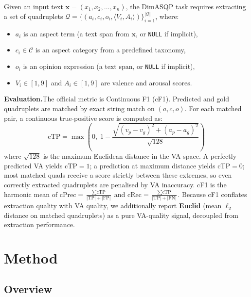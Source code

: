 \documentclass[runningheads]{llncs}
\begin{document}
Given an input text $\mathbf{x} = (x_1, x_2, \ldots, x_n)$, the DimASQP task requires extracting a set of quadruplets $\mathcal{Q} = \{(a_i, c_i, o_i, \langle V_i, A_i \rangle)\}_{i=1}^{|\mathcal{Q}|}$, where:
\begin{itemize}
    \item $a_i$ is an aspect term (a text span from $\mathbf{x}$, or \texttt{NULL} if implicit),
    \item $c_i \in \mathcal{C}$ is an aspect category from a predefined taxonomy,
    \item $o_i$ is an opinion expression (a text span, or \texttt{NULL} if implicit),
    \item $V_i \in [1, 9]$ and $A_i \in [1, 9]$ are valence and arousal scores.
\end{itemize}

\noindent\textbf{Evaluation.}\quad The official metric is Continuous F1 (cF1). Predicted and gold quadruplets are matched by exact string match on $(a, c, o)$. For each matched pair, a continuous true-positive score is computed as:
\begin{equation}
    \text{cTP} = \max\left(0,\; 1 - \frac{\sqrt{(v_p - v_g)^2 + (a_p - a_g)^2}}{\sqrt{128}}\right)
    \label{eq:ctp}
\end{equation}
where $\sqrt{128}$ is the maximum Euclidean distance in the VA space. A perfectly predicted VA yields $\text{cTP}=1$; a prediction at maximum distance yields $\text{cTP}=0$; most matched quads receive a score strictly between these extremes, so even correctly extracted quadruplets are penalised by VA inaccuracy.
cF1 is the harmonic mean of
$\text{cPrec} = \frac{\sum \text{cTP}}{|\text{TP}| + |\text{FP}|}$
and
$\text{cRec} = \frac{\sum \text{cTP}}{|\text{TP}| + |\text{FN}|}$.
Because cF1 conflates extraction quality with VA quality, we additionally report \textbf{Euclid} (mean $\ell_2$ distance on matched quadruplets) as a pure VA-quality signal, decoupled from extraction performance.

\section{Method}
\label{sec:method}

\subsection{Overview}
\end{document}
